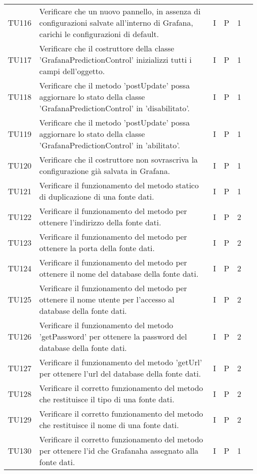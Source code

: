 \begin{longtable} {
		>{}p{12mm}
		>{}p{79.5mm}
		>{}p{9mm}
		>{}p{8mm}
		>{}p{14mm}
		>{}p{0mm}}
	TU116		& Verificare che un nuovo pannello, in assenza di configurazioni salvate all'interno di Grafana, carichi le configurazioni di default. & I & P & 1 & \TBstrut \\ [2mm]
	TU117		& Verificare che il costruttore della classe 'GrafanaPredictionControl' inizializzi tutti i campi dell'oggetto. & I & P & 1 & \TBstrut \\ [2mm]
	TU118		& Verificare che il metodo 'postUpdate' possa aggiornare lo stato della classe 'GrafanaPredictionControl' in 'disabilitato'. & I & P & 1 & \TBstrut \\ [2mm]
	TU119		& Verificare che il metodo 'postUpdate' possa aggiornare lo stato della classe 'GrafanaPredictionControl' in 'abilitato'. & I & P & 1 & \TBstrut \\ [2mm]
	TU120		& Verificare che il costruttore non sovrascriva la configurazione già salvata in Grafana\glo. & I & P & 1 & \TBstrut \\ [2mm]
	TU121		& Verificare il funzionamento del metodo statico di duplicazione di una fonte dati. & I & P & 1 & \TBstrut \\ [2mm]
	TU122		& Verificare il funzionamento del metodo per ottenere l'indirizzo della fonte dati. & I & P & 2 & \TBstrut \\ [2mm]
	TU123		& Verificare il funzionamento del metodo per ottenere la porta della fonte dati. & I & P & 2 & \TBstrut \\ [2mm]
	TU124		& Verificare il funzionamento del metodo per ottenere il nome del database della fonte dati. & I & P & 2 & \TBstrut \\ [2mm]
	TU125		& Verificare il funzionamento del metodo per ottenere il nome utente per l'accesso al database della fonte dati. & I & P & 2 & \TBstrut \\ [2mm]
	TU126		& Verificare il funzionamento del metodo 'getPassword' per ottenere la password del database della fonte dati. & I & P & 2 & \TBstrut \\ [2mm]
	TU127		& Verificare il funzionamento del metodo 'getUrl' per ottenere l'url del database della fonte dati. & I & P & 2 & \TBstrut \\ [2mm]
	TU128		& Verificare il corretto funzionamento del metodo che restituisce il tipo di una fonte dati. & I & P & 2 & \TBstrut \\ [2mm]
	TU129		& Verificare il corretto funzionamento del metodo che restituisce il nome di una fonte dati. & I & P & 2 & \TBstrut \\ [2mm]
	TU130		& Verificare il corretto funzionamento del metodo per ottenere l'id che Grafana\glosp ha assegnato alla fonte dati. & I & P & 1 & \TBstrut \\ [2mm]

\end{longtable}
